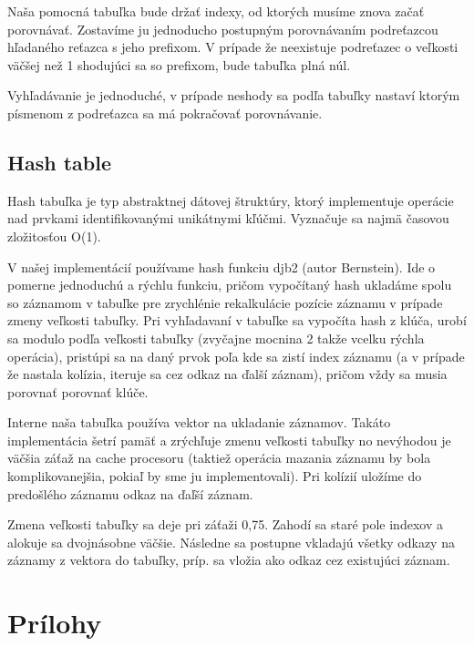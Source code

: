 \documentclass[12pt,a4paper,titlepage,final]{article}
\begin{document}
Naša pomocná tabuľka bude držať indexy, od ktorých musíme znova začať porovnávať.
 Zostavíme ju jednoducho postupným porovnávaním podreťazcou hľadaného reťazca s
 jeho prefixom. V prípade že neexistuje podreťazec o veľkosti väčšej než 1
 shodujúci sa so prefixom, bude tabuľka plná núl.

Vyhľadávanie je jednoduché, v prípade neshody sa podľa tabuľky nastaví ktorým
 písmenom z podreťazca sa má pokračovať porovnávanie.

\subsection{Hash table}
Hash tabuľka je typ abstraktnej dátovej štruktúry, ktorý implementuje operácie
 nad prvkami identifikovanými unikátnymi kľúčmi. Vyznačuje sa najmä časovou
 zložitosťou O(1).

V našej implementácií používame hash funkciu djb2 (autor Bernstein). Ide o
 pomerne jednoduchú a rýchlu funkciu, pričom vypočítaný hash ukladáme spolu so
 záznamom v tabuľke pre zrychlénie rekalkulácie pozície záznamu v prípade
 zmeny veľkosti tabuľky. Pri vyhľadavaní v tabuľke sa vypočíta hash z klúča,
 urobí sa modulo podľa veľkosti tabuľky (zvyčajne mocnina 2 takže vcelku rýchla
 operácia), pristúpi sa na daný prvok poľa kde sa zistí index záznamu (a v
 prípade že nastala kolízia, iteruje sa cez odkaz na ďalší záznam), pričom vždy
 sa musia porovnať porovnať klúče.

Interne naša tabuľka používa vektor na ukladanie záznamov. Takáto implementácia
 šetrí pamäť a zrýchľuje zmenu veľkosti tabuľky no nevýhodou je väčšia záťaž na
 cache procesoru (taktiež operácia mazania záznamu by bola komplikovanejšia,
 pokiaľ by sme ju implementovali). Pri kolízií uložíme do predošlého záznamu
 odkaz na ďaľší záznam.

Zmena veľkosti tabuľky sa deje pri záťaži 0,75. Zahodí sa staré pole indexov a
 alokuje sa dvojnásobne väčšie. Následne sa postupne vkladajú všetky odkazy na
 záznamy z vektora do tabuľky, príp. sa vložia ako odkaz cez existujúci záznam.

\section{Prílohy} \label{Prilohy}
\end{document}
